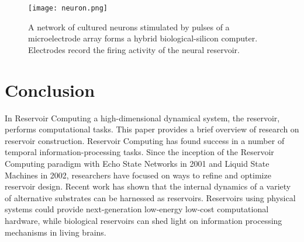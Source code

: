 \documentclass{article}
\begin{document}
     \begin{figure}[h!]
        \centering
            \texttt{[image: neuron.png]}
    \caption{ A network of cultured neurons stimulated by pulses of a 
        microelectrode array forms a hybrid biological-silicon computer.  
            Electrodes record the firing activity of the neural reservoir.  
            \cite{dockendorf2009liquid}}
	    \label{neuron}
            \end{figure}

\section{Conclusion}\label{conclusion}
In Reservoir Computing a high-dimensional dynamical system, the reservoir, 
   performs computational tasks.
This paper provides a brief overview of research on reservoir construction.  
Reservoir Computing has found success in a  number of temporal 
information-processing tasks. Since the inception of the Reservoir Computing 
paradigm with Echo State Networks in 2001 and Liquid State Machines in 2002, 
	 researchers have focused on ways to refine and optimize reservoir 
	 design. Recent work has shown that the internal dynamics of a variety 
	 of alternative substrates can be harnessed as reservoirs.  Reservoirs 
	 using physical systems could provide next-generation low-energy 
	 low-cost computational hardware, while biological reservoirs can shed 
	 light on information processing mechanisms in living brains.



\end{document}
